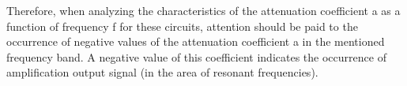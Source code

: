 \documentclass[]{scrartcl}
\begin{document}
\begin{flushleft}
    Therefore, when analyzing the characteristics of the attenuation coefficient a as a function of frequency f for these circuits, attention should be paid to the occurrence of negative values of the attenuation coefficient a in the mentioned frequency band. A negative value of this coefficient indicates the occurrence of amplification
    output signal (in the area of resonant frequencies).
\end{flushleft}
\end{document}
